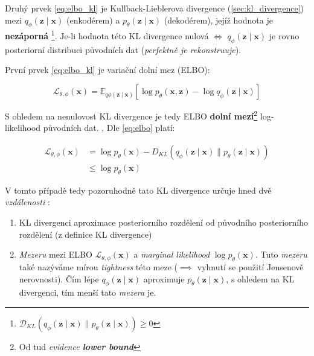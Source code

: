 Druhý prvek \autoref{eq:elbo_kl} je Kullback-Lieblerova divergence (\autoref{sec:kl_divergence}) mezi $q_\phi(\textbf{z}\mid\textbf{x})$ (enkodérem) a $p_\theta(\textbf{z}\mid\textbf{x})$ (dekodérem), jejíž hodnota je \textbf{nezáporná}
\footnote{$\mathcal{D}_{KL}(q_\phi(\textbf{z}\mid\textbf{x})\parallel p_\theta(\textbf{z}\mid\textbf{x})) \geq 0$}.
Je-li hodnota této KL divergence nulová $\iff$ $q_\phi(\textbf{z}\mid\textbf{x})$ je rovno posteriorní distribuci původních dat (\emph{perfektně je rekonstruuje}). \cite{Kingma2019}


První prvek \autoref{eq:elbo_kl} je variační dolní mez (ELBO):

\begin{equation} \label{eq:elbo}
    \mathcal{L}_{\theta,\phi}(\textbf{x}) = \mathds{E}_{q\phi(\textbf{z}\mid\textbf{x})}[\log p_\theta(\textbf{x},\textbf{z}) - \log q_\phi(\textbf{z}\mid\textbf{x})]
\end{equation}

S ohledem na nenulovost KL divergence je tedy ELBO \textbf{dolní mezí}\footnote{Od tud \emph{evidence \textbf{lower bound}}} log-likelihood původních dat. \cite{Kingma2014}, \cite{Goodfellow2016}
Dle \autoref{eq:elbo} platí:

\begin{align}
    \mathcal{L}_{\theta,\phi}(\textbf{x}) &= \log p_\theta(\textbf{x}) - D_{KL}(q_\phi(\textbf{z}\mid\textbf{x})\parallel p_\theta(\textbf{z}\mid\textbf{x})) \\ \label{eq:vae_optimization_objective}
                                          &\leq \log p_\theta(\textbf{x})
\end{align}

V tomto případě tedy pozoruhodně tato KL divergence určuje hned dvě \emph{vzdálenosti} \cite{Kingma2019}:
\begin{enumerate}
    \item KL divergenci aproximace posteriorního rozdělení od původního posteriorního rozdělení (z definice KL divergence)
    \item \emph{Mezeru} mezi ELBO $\mathcal{L}_{\theta,\phi}(\textbf{x})$ a \emph{marginal likelihood} $\log p_\theta(\textbf{x})$. Tuto \emph{mezeru} také nazýváme mírou \emph{tightness} této meze ($\implies$ vyhnutí se použití Jensenově nerovnosti). Čím lépe $q_\phi(\textbf{z}\mid\textbf{x})$ aproximuje $p_\theta(\textbf{z}\mid\textbf{x})$, s ohledem na KL divergenci, tím menší tato \emph{mezera} je.
\end{enumerate}

